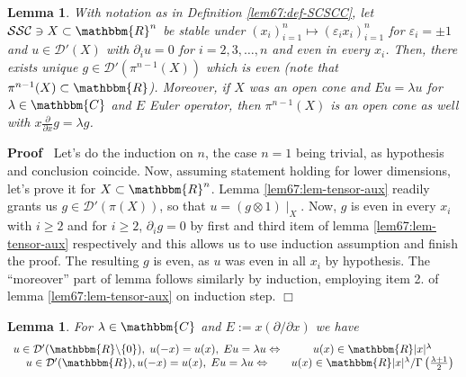 \documentclass[12pt]{article}
\newcommand{\assign}{:=}
\renewenvironment{proof}{\noindent\textbf{Proof\ }}{\hspace*{\fill}$\Box$\medskip}
\newtheorem{lemma}[proposition]{Lemma}
\theoremstyle{remark}
\begin{document}
\begin{lemma}
	\label{lem67:lem-tensor}With notation as in Definition \ref{lem67:def-SCSCC}, let $\mathcal{S}\mathcal{S}\mathcal{C} \ni X \subset
  \mathbbm{R}^n$ be stable under $(x_i)_{i = 1}^n \mapsto (\varepsilon_i
  x_i)_{i = 1}^n$ for $\varepsilon_i = \pm 1$ and $u \in \mathcal{D}' (X)$
  with $\partial_i u = 0$ for $i = 2, 3, \ldots, n$ and even in every $x_i$.
  Then, there exists unique $g \in \mathcal{D}' (\pi^{n - 1} (X))$ which is
  even (note that $\pi^{n - 1} (X) \subset \mathbbm{R}$). Moreover, if $X$ was
  an open cone and $E u = \lambda u$ for $\lambda \in \mathbbm{C}$ and $E$
  Euler operator, then $\pi^{n - 1} (X)$ is an open cone as well with $x
  \frac{\partial}{\partial x} g = \lambda g$.
\end{lemma}

\begin{proof}
  Let's do the induction on $n$, the case $n = 1$ being trivial, as hypothesis
  and conclusion coincide. Now, assuming statement holding for lower
  dimensions, let's prove it for $X \subset \mathbbm{R}^n$. Lemma
  \ref{lem67:lem-tensor-aux} readily grants us $g \in \mathcal{D}' (\pi (X))$,
  so that $u = (g \otimes 1) \mid_X$. Now, $g$ is even in every $x_i$ with
  $i \geqslant 2$ and for $i \geqslant 2$, $\partial_i g = 0$ by first and
  third item of lemma \ref{lem67:lem-tensor-aux} respectively and this allows
  us to use induction assumption and finish the proof. The resulting $g$ is
  even, as $u$ was even in all $x_i$ by hypothesis. The ``moreover'' part of
  lemma follows similarly by induction, employing item 2. of lemma
  \ref{lem67:lem-tensor-aux} on induction step.
\end{proof}

\begin{lemma}
  \label{lem67:lem-homogR}For $\lambda \in \mathbbm{C}$ and $E \assign x
  (\partial / \partial x)$ we have
  \[ \begin{array}{cc}
       \begin{array}{c}
         
       \end{array} u \in \mathcal{D}' (\mathbbm{R}\backslash \{ 0 \}), \; u (-
       x) = u (x), \; E u = \lambda u \Leftrightarrow & u (x) \in \mathbbm{R}
       | x |^{\lambda}\\
       u \in \mathcal{D}' (\mathbbm{R}), u (- x) = u (x), \; E u = \lambda u
       \Leftrightarrow & u (x) \in \mathbbm{R} | x |^{\lambda} / \Gamma \left(
       \frac{\lambda + 1}{2} \right)
     \end{array} \]
\end{lemma}
\end{document}
